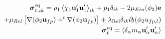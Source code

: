 \begin{align*}
    \bm{\sigma}^\text{eq}_{1,ik} =
    \rho_1\left<\chi_1\textbf{u}_1'\textbf{u}_1'\right>_{ik} 
    + p_1 \delta_{ik}
    - 2 \mu_{Ein}(\phi_2) \textbf{e}\\
    + \mu_{Rel} \left[\mathbf{\nabla} (\phi_2\textbf{u}_{fp}) + ^t\mathbf{\nabla} (\phi_2\textbf{u}_{fp})\right]
    + \lambda_\text{Rel}
        \delta_{ik} \partial_l(\phi_2 u_{fp,l})\\
    \bm\sigma_p^\text{eq}
    = \left<\delta_\alpha m_\alpha\textbf{u}_\alpha'\textbf{u}_\alpha'\right>
\end{align*}

